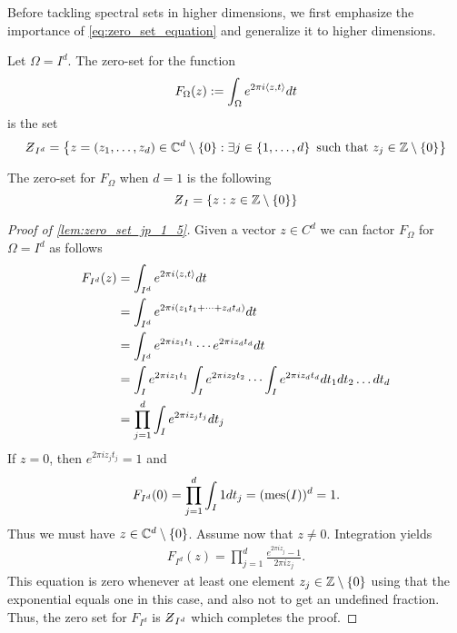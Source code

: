 \documentclass[../thesis.tex]{subfiles}
\begin{document}
Before tackling spectral sets in higher dimensions, we first emphasize the importance of \cref{eq:zero_set_equation} and generalize it to higher dimensions. 
\begin{lemma}\label{lem:zero_set_jp_1_5}
    Let $\Omega=I^d$. The zero-set for the function
    \begin{equation*}
        F_{\Omega} (z):= \int_\Omega e^{2 \pi i \langle z,t\rangle} dt
    \end{equation*}
    is the set
    \begin{equation*}
        \Zstroke_{I^d} = \braqMed{ z = \brac{z_1,\dots,z_d}\in \C^d \setminus \braqMed{0} : \exists \space j \in \braqMed{1,\dots, d} \text{ such that } z_j \in  \intnozero}
    \end{equation*}
\end{lemma}

\begin{example}
    The zero-set for $F_{\Omega}$ when $d=1$ is the following
    \begin{equation*}
        \Zstroke_{I} = \braq{z: z \in \intnozero} \qedhere
    \end{equation*}
\end{example}

\begin{proof}[Proof of  \cref{lem:zero_set_jp_1_5}]
    Given a vector $z \in C^d$ we can factor $F_{\Omega}$ for $\Omega = I^d$ as follows
    \begin{align*}
        F_{I^d} (z) &= \int_{I^d} e^{2 \pi i \langle z,t\rangle} dt\\
        &= \int_{I^d} e^{2\pi i  (z_1 t_1 + \dots +z_d t_d)} dt\\
        &= \int_{I^d} e^{2\pi i z_1 t_1}  \cdots e^{2\pi i z_d t_d}  dt\\
        &= \int_{I} e^{2\pi i z_1 t_1} \int_{I} e^{2\pi i z_2 t_2}  \cdots \int_{I} e^{2\pi i z_d t_d}  dt_1 dt_2\dots dt_d\\
        &=\prod_{j=1}^d \int_I e^{2\pi i z_j t_j} dt_j
    \end{align*}
    If $z=0$, then $e^{2\pi i z_j t_j} = 1$ and
    \begin{align*}
        F_{I^d} (0) = \prod_{j=1}^d \int_I 1 \space dt_j = (\operatorname{mes}(I))^d = 1.
    \end{align*}
    Thus we must have $z\in \mathbb{C}^d\setminus\{0\}$. Assume now that $z\neq 0$. Integration yields
    \begin{align*}
        F_{I^d} (z) = \prod_{j=1}^d \frac{e^{2 \pi i z_j} -1}{2 \pi i z_j}.
    \end{align*}
    This equation is zero whenever at least one element $z_j\in \mathbb{Z}\setminus\{0\}$ using that the exponential equals one in this case, and also not to get an undefined fraction. Thus, the zero set for $F_{I^d}$ is $\Zstroke_{I^d}$ which completes the proof.
\end{proof}
\end{document}
